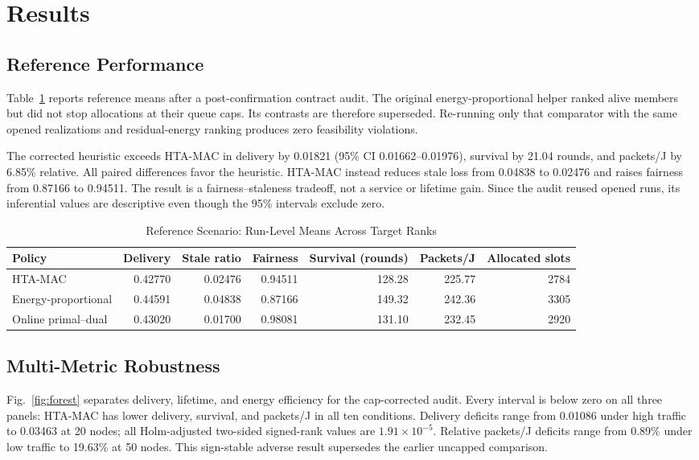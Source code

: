 \documentclass[journal]{IEEEtran}
\newcommand{\method}{HTA-MAC}
\begin{document}
\section{Results}

\subsection{Reference Performance}

Table~\ref{tab:reference} reports reference means after a post-confirmation
contract audit. The original energy-proportional helper ranked alive members
but did not stop allocations at their queue caps. Its contrasts are therefore
superseded. Re-running only that comparator with the same opened realizations
and residual-energy ranking produces zero feasibility violations.

The corrected heuristic exceeds \method{} in delivery by 0.01821 (95\% CI
0.01662--0.01976), survival by 21.04 rounds, and packets/J by 6.85\% relative.
All paired differences favor the heuristic. \method{} instead reduces stale
loss from 0.04838 to 0.02476 and raises fairness from 0.87166 to 0.94511. The
result is a fairness--staleness tradeoff, not a service or lifetime gain. Since
the audit reused opened runs, its inferential values are descriptive even
though the 95\% intervals exclude zero.

\begin{table}[t]
\centering
\caption{Reference Scenario: Run-Level Means Across Target Ranks}
\label{tab:reference}
\small
\begin{tabular}{@{}lrrrrrr@{}}
\toprule
Policy & Delivery & Stale ratio & Fairness & Survival (rounds) & Packets/J & Allocated slots \\
\midrule
\method & 0.42770 & 0.02476 & 0.94511 & 128.28 & 225.77 & 2784 \\
Energy-proportional & 0.44591 & 0.04838 & 0.87166 & 149.32 & 242.36 & 3305 \\
Online primal--dual & 0.43020 & 0.01700 & 0.98081 & 131.10 & 232.45 & 2920 \\
\bottomrule
\end{tabular}
\end{table}

\subsection{Multi-Metric Robustness}

Fig.~\ref{fig:forest} separates delivery, lifetime, and energy efficiency for
the cap-corrected audit. Every interval is below zero on all three panels:
\method{} has lower delivery, survival, and packets/J in all ten conditions.
Delivery deficits range from 0.01086 under high traffic to 0.03463 at 20 nodes;
all Holm-adjusted two-sided signed-rank values are $1.91\times10^{-5}$. Relative
packets/J deficits range from 0.89\% under low traffic to 19.63\% at 50 nodes.
This sign-stable adverse result supersedes the earlier uncapped comparison.
\end{document}
